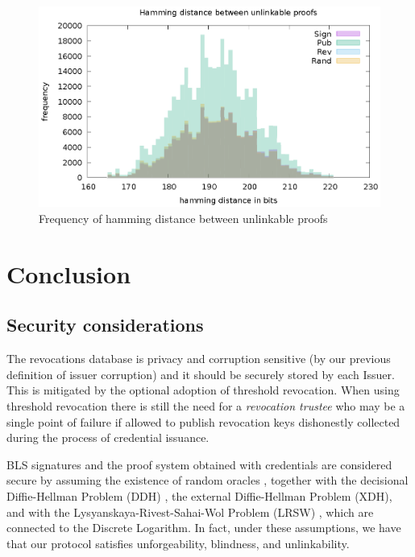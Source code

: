 \documentclass[conference]{IEEEtran}
\begin{document}
\begin{figure}
    \centering
    \includegraphics[width=1\linewidth]{hamming.eps}

    \caption{Frequency of hamming distance between unlinkable proofs}
    \label{fig:hamming}
\end{figure}


\section{Conclusion}
\subsection{Security considerations}

The revocations database is privacy and corruption sensitive (by our previous definition of issuer corruption) and it should be securely stored by each Issuer. This is mitigated by the optional adoption of threshold revocation. When using threshold revocation there is still the need for a \textit{revocation trustee} who may be a single point of failure if allowed to publish revocation keys dishonestly collected during the process of credential issuance.

BLS signatures and the proof system obtained with credentials are
considered secure by assuming the existence of random oracles
\cite{random-oracle}, together with the decisional Diffie-Hellman
Problem (DDH) \cite{DDH-problem}, the external Diffie-Hellman Problem
(XDH), and with the Lysyanskaya-Rivest-Sahai-Wol Problem (LRSW)
\cite{lrsw-assumption}, which are connected to the Discrete
Logarithm. In fact, under these assumptions, we have that our protocol
satisfies unforgeability, blindness, and unlinkability.
\end{document}
